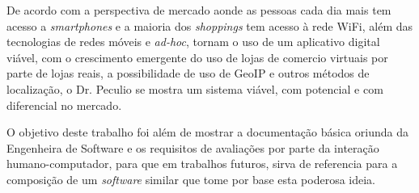 De acordo com a perspectiva de mercado aonde as pessoas cada dia mais tem acesso a 
\emph{smartphones} e a maioria dos \emph{shoppings} tem acesso à rede 
WiFi, além das tecnologias de redes 
móveis e \emph{ad-hoc}, tornam o uso de um aplicativo digital viável, com o crescimento emergente 
do uso de lojas de comercio virtuais por parte de lojas reais, a possibilidade de uso de GeoIP e 
outros métodos de localização, o Dr. Peculio se mostra um sistema viável, com potencial e com 
diferencial no mercado.

O objetivo deste trabalho foi além de mostrar a documentação básica oriunda da 
Engenheira de Software e os requisitos de avaliações por parte da interação 
humano-computador, para que em trabalhos futuros, sirva de referencia para a composição de um 
\emph{software} similar que tome por base esta poderosa ideia.
